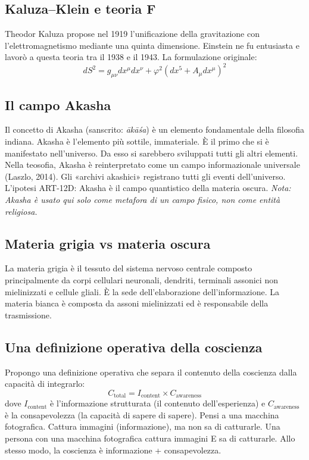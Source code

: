 \subsection{Kaluza--Klein e teoria F}
Theodor Kaluza propose nel 1919 l'unificazione della gravitazione con l'elettromagnetismo mediante una quinta dimensione. Einstein ne fu entusiasta e lavorò a questa teoria tra il 1938 e il 1943. La formulazione originale:
\begin{equation}
dS^2 = g_{\mu\nu} dx^\mu dx^\nu + \varphi^2(dx^5 + A_{\mu} dx^\mu)^2
\end{equation}

\subsection{Il campo Akasha}
Il concetto di Akasha (sanscrito: \emph{ākāśa}) è un elemento fondamentale della filosofia indiana. Akasha è l'elemento più sottile, immateriale. È il primo che si è manifestato nell'universo. Da esso si sarebbero sviluppati tutti gli altri elementi. Nella teosofia, Akasha è reinterpretato come un campo informazionale universale (Laszlo, 2014). Gli «archivi akashici» registrano tutti gli eventi dell'universo. L'ipotesi ART-12D: Akasha è il campo quantistico della materia oscura. \textit{Nota: Akasha è usato qui solo come metafora di un campo fisico, non come entità religiosa.}

\subsection{Materia grigia vs materia oscura}
La materia grigia è il tessuto del sistema nervoso centrale composto principalmente da corpi cellulari neuronali, dendriti, terminali assonici non mielinizzati e cellule gliali. È la sede dell'elaborazione dell'informazione. La materia bianca è composta da assoni mielinizzati ed è responsabile della trasmissione.

\subsection{Una definizione operativa della coscienza}
Propongo una definizione operativa che separa il contenuto della coscienza dalla capacità di integrarlo:
\begin{equation}
C_{\text{total}} = I_{\text{content}} \times C_{\text{awareness}}
\end{equation}
dove $I_{\text{content}}$ è l'informazione strutturata (il contenuto dell'esperienza) e $C_{\text{awareness}}$ è la consapevolezza (la capacità di sapere di sapere). Pensi a una macchina fotografica. Cattura immagini (informazione), ma non sa di catturarle. Una persona con una macchina fotografica cattura immagini E sa di catturarle. Allo stesso modo, la coscienza è informazione + consapevolezza.

